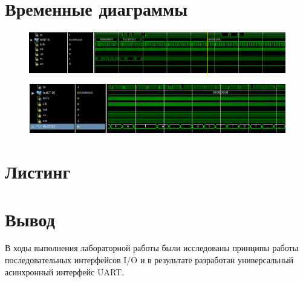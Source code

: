 \documentclass[a4paper, 10pt]{article}
\begin{document}
     \section*{Временные диаграммы}
        \begin{figure}[h!]
            \includegraphics[scale=0.5]{../images/ctl_plot.png}
        \end{figure}
        \begin{figure}[h!]
            \includegraphics[scale=0.5]{../images/ctl_plot_send_mode.png}
        \end{figure}

     \section*{Листинг}
        
        
        
        
        
        
        
        

    \section*{Вывод}
        В ходы выполнения лабораторной работы были исследованы принципы работы
        последовательных интерфейсов I/O и в результате разработан универсальный
        асинхронный интерфейс UART.
\end{document}
